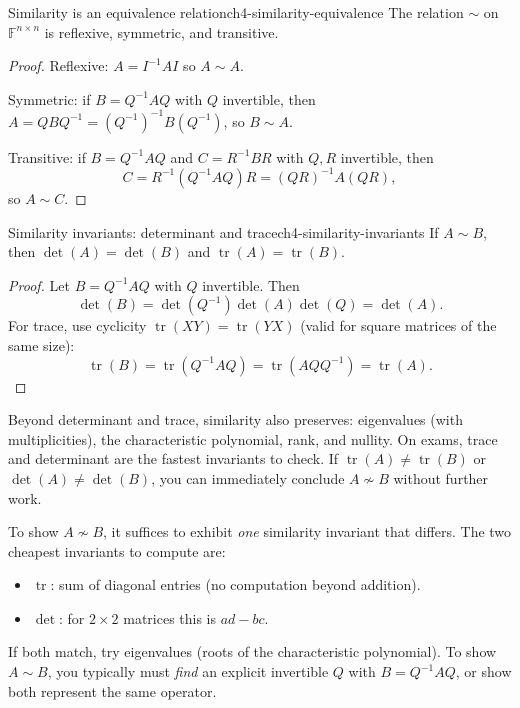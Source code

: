 \begin{theorem}{Similarity is an equivalence relation}{ch4-similarity-equivalence}
The relation $\sim$ on $\mathbb{F}^{n\times n}$ is reflexive, symmetric, and transitive.
\end{theorem}

\begin{proof}
Reflexive: $A=I^{-1}AI$ so $A\sim A$.

Symmetric: if $B=Q^{-1}AQ$ with $Q$ invertible, then $A=Q B Q^{-1}=(Q^{-1})^{-1} B (Q^{-1})$, so $B\sim A$.

Transitive: if $B=Q^{-1}AQ$ and $C=R^{-1}BR$ with $Q,R$ invertible, then
\[
C=R^{-1}(Q^{-1}AQ)R=(QR)^{-1}A(QR),
\]
so $A\sim C$.
\end{proof}

\begin{theorem}{Similarity invariants: determinant and trace}{ch4-similarity-invariants}
If $A\sim B$, then $\det(A)=\det(B)$ and $\operatorname{tr}(A)=\operatorname{tr}(B)$.
\end{theorem}

\begin{proof}
Let $B=Q^{-1}AQ$ with $Q$ invertible. Then
\[
\det(B)=\det(Q^{-1})\det(A)\det(Q)=\det(A).
\]
For trace, use cyclicity $\operatorname{tr}(XY)=\operatorname{tr}(YX)$ (valid for square matrices of the same size):
\[
\operatorname{tr}(B)=\operatorname{tr}(Q^{-1}AQ)=\operatorname{tr}(AQQ^{-1})=\operatorname{tr}(A).
\]
\end{proof}

Beyond determinant and trace, similarity also preserves: eigenvalues (with multiplicities), the characteristic polynomial, rank, and nullity.
On exams, trace and determinant are the fastest invariants to check.
If $\operatorname{tr}(A)\neq\operatorname{tr}(B)$ or $\det(A)\neq\det(B)$, you can immediately conclude $A\not\sim B$ without further work.

\begin{examtip}[title={Exam Focus: proving two matrices are NOT similar}]
To show $A\not\sim B$, it suffices to exhibit \emph{one} similarity invariant that differs.
The two cheapest invariants to compute are:
\begin{itemize}
\item $\operatorname{tr}$: sum of diagonal entries (no computation beyond addition).
\item $\det$: for $2\times 2$ matrices this is $ad-bc$.
\end{itemize}
If both match, try eigenvalues (roots of the characteristic polynomial).
To show $A\sim B$, you typically must \emph{find} an explicit invertible $Q$ with $B=Q^{-1}AQ$, or show both represent the same operator.
\end{examtip}

